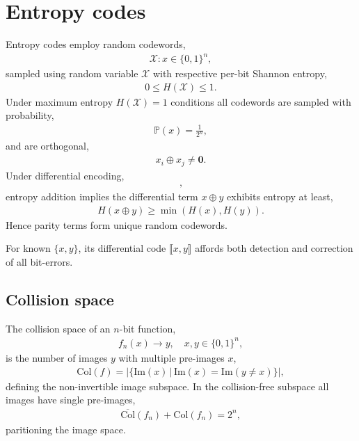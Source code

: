 \documentclass[twocolumn, aps, amsmath, amssymb, nofootinbib, superscriptaddress, longbibliography, doublefloatfix, table-of-contents, eqsecnum, rmp]{revtex4-2}
\def\diff#1#2{\llbracket #1,#2\rrbracket}
\begin{document}
\section{Entropy codes}

Entropy codes employ random codewords,
\begin{align}
	\mathcal{X}: x \in \{0,1\}^n,
\end{align}
sampled using random variable $\mathcal{X}$ with respective per-bit Shannon entropy,
\begin{align}
	0\leq H(\mathcal{X})\leq 1.
\end{align}
Under maximum entropy $H(\mathcal{X})=1$ conditions all codewords are sampled with probability,
\begin{align}
	\mathbb{P}(x) = \frac{1}{2^n},	
\end{align}
and are orthogonal,
\begin{align}
	x_i \oplus x_j \neq \mathbf{0}.
\end{align}
Under differential encoding,
\begin{align}
	[x,x\oplus y],
\end{align}
entropy addition implies the differential term $x\oplus y$ exhibits entropy at least,
\begin{align}
	H(x\oplus y) \geq \min(H(x),H(y)).
\end{align}
Hence parity terms form unique random codewords.

For known $\{x,y\}$, its differential code $\diff{x}{y}$ affords both detection and correction of all bit-errors.

\subsection{Collision space}

The collision space of an $n$-bit function,
\begin{align}
	f_n(x) \to y,\quad x,y\in\{0,1\}^n,
\end{align}
is the number of images $y$ with multiple pre-images $x$,
\begin{align}
	\mathrm{Col}(f) = |\{\mathrm{Im}(x)\,|\,\mathrm{Im}(x)=\mathrm{Im}(y\neq x)\}|,
\end{align}
defining the non-invertible image subspace. In the collision-free subspace all images have single pre-images,
\begin{align}
	\overline{\mathrm{Col}}(f_n) + \mathrm{Col}(f_n) = 2^n,
\end{align}
paritioning the image space.
\end{document}
